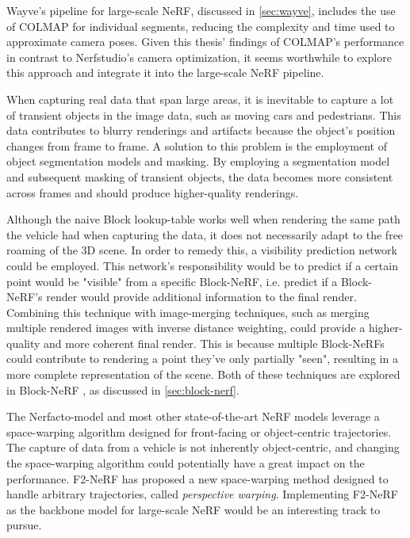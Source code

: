 Wayve's pipeline for large-scale NeRF, discussed in \autoref{sec:wayve}, includes the use of COLMAP for individual segments, reducing the complexity and time used to approximate camera poses. Given this thesis' findings of COLMAP's performance in contrast to Nerfstudio's camera optimization, it seems worthwhile to explore this approach and integrate it into the large-scale NeRF pipeline.

When capturing real data that span large areas, it is inevitable to capture a lot of transient objects in the image data, such as moving cars and pedestrians. This data contributes to blurry renderings and artifacts because the object's position changes from frame to frame. A solution to this problem is the employment of object segmentation models and masking. By employing a segmentation model and subsequent masking of transient objects, the data becomes more consistent across frames and should produce higher-quality renderings.

Although the naive Block lookup-table works well when rendering the same path the vehicle had when capturing the data, it does not necessarily adapt to the free roaming of the 3D scene. In order to remedy this, a visibility prediction network could be employed. This network's responsibility would be to predict if a certain point would be "visible" from a specific Block-NeRF, i.e. predict if a Block-NeRF's render would provide additional information to the final render. Combining this technique with image-merging techniques, such as merging multiple rendered images with inverse distance weighting, could provide a higher-quality and more coherent final render. This is because multiple Block-NeRFs could contribute to rendering a point they've only partially "seen", resulting in a more complete representation of the scene. Both of these techniques are explored in Block-NeRF \cite{tancik_block-nerf_2022}, as discussed in \autoref{sec:block-nerf}.

The Nerfacto-model and most other state-of-the-art NeRF models leverage a space-warping algorithm designed for front-facing or object-centric trajectories. The capture of data from a vehicle is not inherently object-centric, and changing the space-warping algorithm could potentially have a great impact on the performance. F2-NeRF \cite{wang_f2-nerf_2023} has proposed a new space-warping method designed to handle arbitrary trajectories, called \textit{perspective warping}. Implementing F2-NeRF as the backbone model for large-scale NeRF would be an interesting track to pursue.





